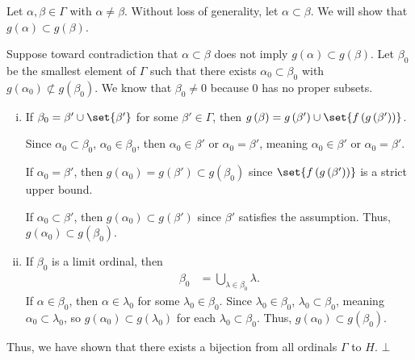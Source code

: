 \documentclass[12pt]{mypackage}
\begin{document}
\begin{solution}
  Let $\alpha,\beta \in \Gamma$ with $\alpha \neq \beta$. Without loss of generality, let $\alpha \subset \beta$. We will show that $g\left(\alpha\right) \subset g\left(\beta\right)$.\newline
  
  Suppose toward contradiction that $\alpha\subset \beta$ does not imply $g\left(\alpha\right)\subset g\left(\beta\right)$. Let $\beta_0$ be the smallest element of $\Gamma$ such that there exists $\alpha_0\subset \beta_0$ with $g\left(\alpha_0\right)\nsubset g\left(\beta_0\right)$. We know that $\beta_0\neq 0$ because $0$ has no proper subsets.
  \begin{enumerate}[(i)]
    \item If $\beta_0 = \beta' \cup \set{\beta'}$ for some $\beta'\in \Gamma$, then $g\left(\beta\right) = g\left(\beta'\right)\cup \set{f\left(g\left(\beta'\right)\right)}$.\newline

      Since $\alpha_0 \subset \beta_0$, $\alpha_0\in \beta_0$, then $\alpha_0 \in \beta'$ or $\alpha_0 = \beta'$, meaning $\alpha_0\in \beta'$ or $\alpha_0 = \beta'$.\newline

      If $\alpha_0 = \beta'$, then $g\left(\alpha_0\right) = g\left(\beta'\right)\subset g\left(\beta_0\right)$ since $\set{f\left(g\left(\beta'\right)\right)}$ is a strict upper bound.\newline

      If $\alpha_0 \subset \beta'$, then $g\left(\alpha_0\right) \subset g\left(\beta'\right)$ since $\beta'$ satisfies the assumption. Thus, $g\left(\alpha_0\right)\subset g\left(\beta_0\right)$.
    \item If $\beta_0$ is a limit ordinal, then
      \begin{align*}
        \beta_0 &= \bigcup_{\lambda \in \beta_0}\lambda.
      \end{align*}
      If $\alpha \in \beta_0$, then $\alpha \in \lambda_0$ for some $\lambda_0\in \beta_0$. Since $\lambda_0\in \beta_0$, $\lambda_0\subset \beta_0$, meaning $\alpha_0\subset \lambda_0$, so $g\left(\alpha_0\right)\subset g\left(\lambda_0\right)$ for each $\lambda_0\subset \beta_0$. Thus, $g\left(\alpha_0\right)\subset g\left(\beta_0\right)$.
  \end{enumerate}
  Thus, we have shown that there exists a bijection from all ordinals $\Gamma$ to $H$. $\bot$
\end{solution}
\end{document}
